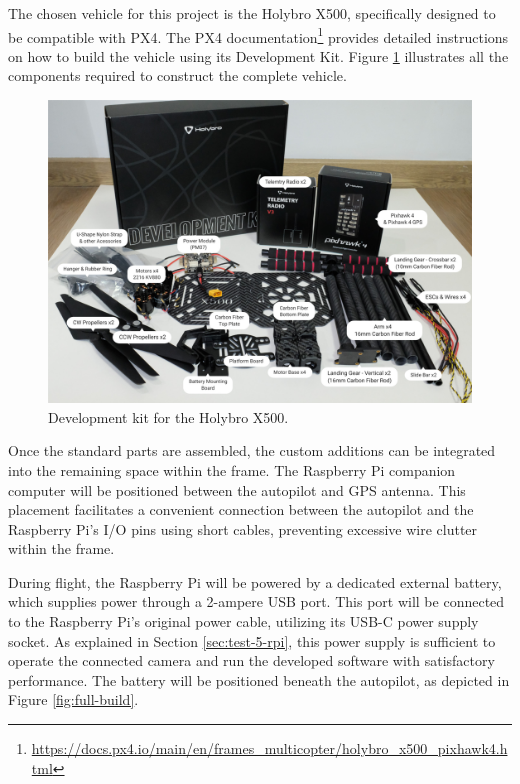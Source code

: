 The chosen vehicle for this project is the Holybro X500, specifically designed to be compatible with PX4. The PX4 documentation\footnote{\url{https://docs.px4.io/main/en/frames_multicopter/holybro_x500_pixhawk4.html}} provides detailed instructions on how to build the vehicle using its Development Kit. Figure \ref{fig:x500-dev-kit} illustrates all the components required to construct the complete vehicle.

\begin{figure}[H]
  \centering
  \includegraphics[width=.9\textwidth, keepaspectratio]{img/x500-dev-kit.jpg}
  \caption{Development kit for the Holybro X500.}
  \label{fig:x500-dev-kit}
\end{figure}


Once the standard parts are assembled, the custom additions can be integrated into the remaining space within the frame. The Raspberry Pi companion computer will be positioned between the autopilot and GPS antenna. This placement facilitates a convenient connection between the autopilot and the Raspberry Pi's I/O pins using short cables, preventing excessive wire clutter within the frame. 


During flight, the Raspberry Pi will be powered by a dedicated external battery, which supplies power through a 2-ampere USB port. This port will be connected to the Raspberry Pi's original power cable, utilizing its USB-C power supply socket. As explained in Section \ref{sec:test-5-rpi}, this power supply is sufficient to operate the connected camera and run the developed software with satisfactory performance. The battery will be positioned beneath the autopilot, as depicted in Figure \ref{fig:full-build}. 


